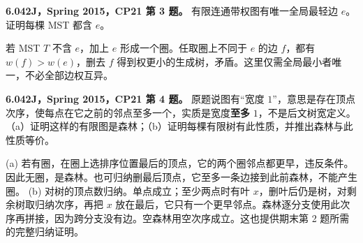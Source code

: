 \begin{exercise}\label{mit:6042-cp21-q3}
\textbf{6.042J，Spring 2015，CP21 第 3 题。}
有限连通带权图有唯一全局最轻边 $e$。证明每棵 MST 都含 $e$。
\end{exercise}
\begin{solution}
若 MST $T$ 不含 $e$，加上 $e$ 形成一个圈。任取圈上不同于 $e$ 的边 $f$，都有 $w(f)>w(e)$，删去 $f$ 得到权更小的生成树，矛盾。这里仅需全局最小者唯一，不必全部边权互异。
\end{solution}

\begin{exercise}\label{mit:6042-cp21-q4}
\textbf{6.042J，Spring 2015，CP21 第 4 题。}
原题说图有“宽度 $1$”，意思是存在顶点次序，使每点在它之前的邻点至多一个，实质是宽度\textbf{至多} $1$，不是后文树宽定义。
（a）证明这样的有限图是森林；（b）证明每棵有限树有此性质，并推出森林与此性质等价。
\end{exercise}
\begin{solution}
(a) 若有圈，在圈上选排序位置最后的顶点，它的两个圈邻点都更早，违反条件。因此无圈，是森林。也可归纳删最后顶点，它至多一条边接到此前森林，不能产生圈。
(b) 对树的顶点数归纳。单点成立；至少两点时有叶 $x$，删叶后仍是树，对剩余树取归纳次序，再把 $x$ 放在最后，它只有一个更早邻点。森林逐分支使用此次序再拼接，因为跨分支没有边。空森林用空次序成立。这也提供期末第 2 题所需的完整归纳证明。
\end{solution}

